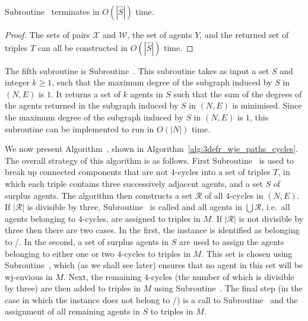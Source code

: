 \begin{lem}
\label{lem:threed_efr_as_wjenvy_max_degree_2_subroutine_configureSurplusAgents_running_time}
Subroutine~ terminates in $O(|\hat{S}|)$ time.
\end{lem}
\begin{proof}
The sets of pairs $\mathcal{X}$ and $\mathcal{W}$, the set of agents $Y$, and the returned set of triples $T$ can all be constructed in $O(|\hat{S}|)$ time.
\end{proof}

The fifth subroutine is Subroutine~. This subroutine takes as input a set $S$ and integer $k\geq 1$, such that the maximum degree of the subgraph induced by $S$ in $(N, E)$ is $1$. It returns a set of $k$ agents in $S$ such that the sum of the degrees of the agents returned in the subgraph induced by $S$ in $(N, E)$ is minimised. Since the maximum degree of the subgraph induced by $S$ in $(N, E)$ is $1$, this subroutine can be implemented to run in $O(|N|)$ time.

We now present Algorithm~, shown in Algorithm~\ref{alg:3defr_wje_paths_cycles}. The overall strategy of this algorithm is as follows. First Subroutine~ is used to break up connected components that are not $4$-cycles into a set of triples $T$, in which each triple contains three successively adjacent agents, and a set $S$ of surplus agents. 
The algorithm then constructs a set $\mathcal{R}$ of all $4$-cycles in $(N, E)$. If $|\mathcal{R}|$ is divisible by three, Subroutine~ is called and all agents in $\bigcup \mathcal{R}$, i.e.\ all agents belonging to $4$-cycles, are assigned to triples in $M$. If $|\mathcal{R}|$ is not divisible by three then there are two cases. In the first, the instance is identified as belonging to \iwjnomaxdegreetwofamily/. In the second, a set of surplus agents in $S$ are used to assign the agents belonging to either one or two $4$-cycles to triples in $M$. This set is chosen using Subroutine~, which (as we shall see later) ensures that no agent in this set will be wj-envious in $M$. Next, the remaining $4$-cycles (the number of which is divisible by three) are then added to triples in $M$ using Subroutine~.
The final step (in the case in which the instance does not belong to \iwjnomaxdegreetwofamily/) is a call to Subroutine~ and the assignment of all remaining agents in $S$ to triples in $M$.

